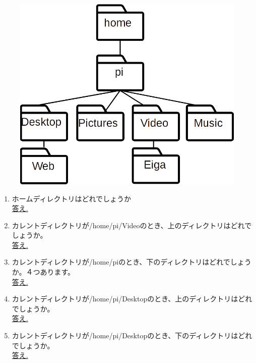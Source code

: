 \begin{tcolorbox}[title=\useOmetoi]
\begin{figure}[H]
 \centering
 \includegraphics[width=0.6\linewidth]{images/chap03/text03-img005.png}
\end{figure}
\begin{enumerate}
\item ホームディレクトリはどれでしょうか\\
\underline{答え.\hspace{0.8\linewidth}}
\item カレントディレクトリが/home/pi/Videoのとき、上のディレクトリはどれでしょうか。\\
\underline{答え.\hspace{0.8\linewidth}}
\item カレントディレクトリが/home/piのとき、下のディレクトリはどれでしょうか。４つあります。\\
\underline{答え.\hspace{0.8\linewidth}}
\item カレントディレクトリが/home/pi/Desktopのとき、上のディレクトリはどれでしょうか。\\
\underline{答え.\hspace{0.8\linewidth}}
\item カレントディレクトリが/home/pi/Desktopのとき、下のディレクトリはどれでしょうか。\\
\underline{答え.\hspace{0.8\linewidth}}
\end{enumerate}
\end{tcolorbox}
